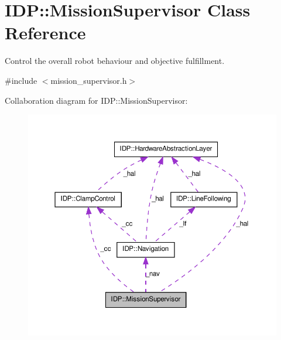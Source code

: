 \hypertarget{classIDP_1_1MissionSupervisor}{
\section{IDP::MissionSupervisor Class Reference}
\label{classIDP_1_1MissionSupervisor}
}


Control the overall robot behaviour and objective fulfillment.  




{\ttfamily \#include $<$mission\_\-supervisor.h$>$}



Collaboration diagram for IDP::MissionSupervisor:\nopagebreak
\begin{figure}[H]
\begin{center}
\leavevmode
\includegraphics[width=367pt]{classIDP_1_1MissionSupervisor__coll__graph}
\end{center}
\end{figure}
